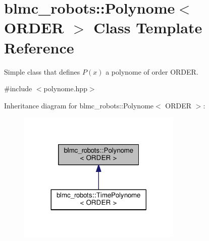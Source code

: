 \hypertarget{classblmc__robots_1_1Polynome}{}\section{blmc\+\_\+robots\+:\+:Polynome$<$ O\+R\+D\+ER $>$ Class Template Reference}
\label{classblmc__robots_1_1Polynome}


Simple class that defines $ P(x) $ a polynome of order O\+R\+D\+ER.  




{\ttfamily \#include $<$polynome.\+hpp$>$}



Inheritance diagram for blmc\+\_\+robots\+:\+:Polynome$<$ O\+R\+D\+ER $>$\+:
\nopagebreak
\begin{figure}[H]
\begin{center}
\leavevmode
\includegraphics[width=221pt]{classblmc__robots_1_1Polynome__inherit__graph}
\end{center}
\end{figure}
